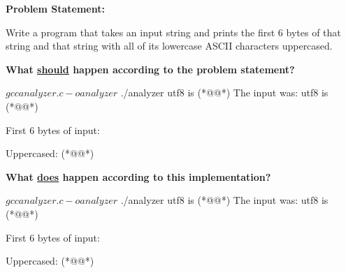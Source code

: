 \documentclass[12pt, oneside, landscape]{article}
\begin{document}
\begin{minipage}[t]{0.45\textwidth}



\end{minipage}
\hfill
\begin{minipage}[t]{0.45\textwidth}

\small
\textbf{Problem Statement:}

Write a program that takes an input string and prints the first 6 bytes of that string and that string with all of its lowercase ASCII characters uppercased.

\vspace{2em}

\textbf{What \underline{should} happen according to the problem statement?}

\begin{shell}[linewidth=20em, basicstyle=\ttfamily\scriptsize]
$ gcc analyzer.c -o analyzer
$ ./analyzer
utf8 is (*@@*)
The input was: utf8 is (*@@*)

First 6 bytes of input: 

Uppercased: 
(*@\vspace{1em}@*) 
\end{shell}

\vspace{2em}

\textbf{What \underline{does} happen according to this implementation?}

\begin{shell}[linewidth=20em, basicstyle=\ttfamily\scriptsize]
$ gcc analyzer.c -o analyzer
$ ./analyzer
utf8 is (*@@*)
The input was: utf8 is (*@@*)

First 6 bytes of input: 

Uppercased: 
(*@\vspace{1em}@*) 
\end{shell}

\end{minipage}
\end{document}
